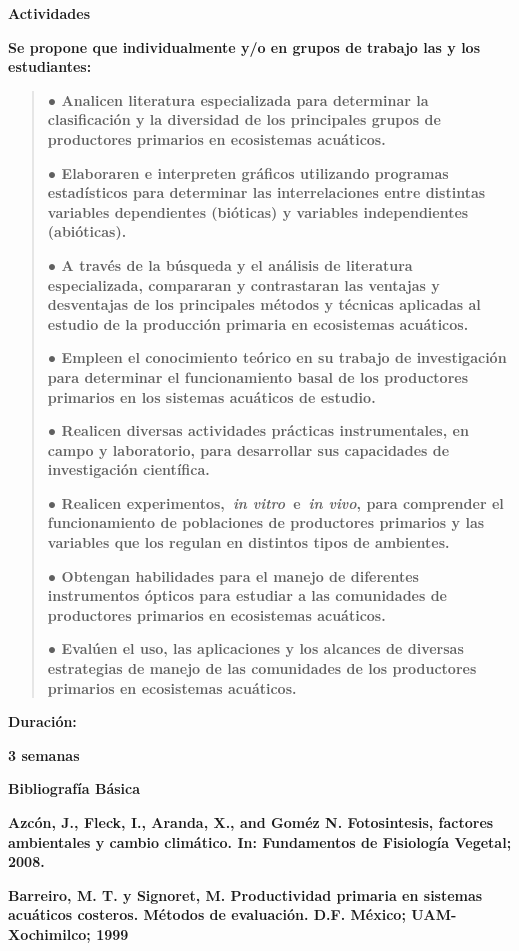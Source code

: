 \documentclass[
]{article}
\begin{document}
\textbf{Actividades}

\textbf{Se propone que individualmente y/o en grupos de trabajo las y
los estudiantes:}

\begin{quote}
\textbf{● Analicen literatura especializada para determinar la
clasificación y la diversidad de los principales grupos de productores
primarios en ecosistemas acuáticos.}

\textbf{● Elaboraren e interpreten gráficos utilizando programas
estadísticos para determinar las interrelaciones entre distintas
variables dependientes (bióticas) y variables independientes
(abióticas).}

\textbf{● A través de la búsqueda y el análisis de literatura
especializada, compararan y contrastaran las ventajas y desventajas de
los principales métodos y técnicas aplicadas al estudio de la producción
primaria en ecosistemas acuáticos.}

\textbf{● Empleen el conocimiento teórico en su trabajo de investigación
para determinar el funcionamiento basal de los productores primarios en
los sistemas acuáticos de estudio.}

\textbf{● Realicen diversas actividades prácticas instrumentales, en
campo y laboratorio, para desarrollar sus capacidades de investigación
científica.}

\textbf{● Realicen experimentos,~\emph{in vitro}~e~\emph{in vivo}, para
comprender el funcionamiento de poblaciones de productores primarios y
las variables que los regulan en distintos tipos de ambientes.}

\textbf{● Obtengan habilidades para el manejo de diferentes instrumentos
ópticos para estudiar a las comunidades de productores primarios en
ecosistemas acuáticos.}

\textbf{● Evalúen el uso, las aplicaciones y los alcances de diversas
estrategias de manejo de las comunidades de los productores primarios en
ecosistemas acuáticos.}
\end{quote}

\textbf{Duración:}

\textbf{3 semanas}

\textbf{Bibliografía Básica}

\textbf{Azcón, J., Fleck, I., Aranda, X., and Goméz N. Fotosintesis,
factores ambientales y cambio climático. In: Fundamentos de Fisiología
Vegetal; 2008.}

\textbf{Barreiro, M. T. y Signoret, M. Productividad primaria en
sistemas acuáticos costeros. Métodos de evaluación. D.F. México;
UAM-Xochimilco; 1999}
\end{document}
